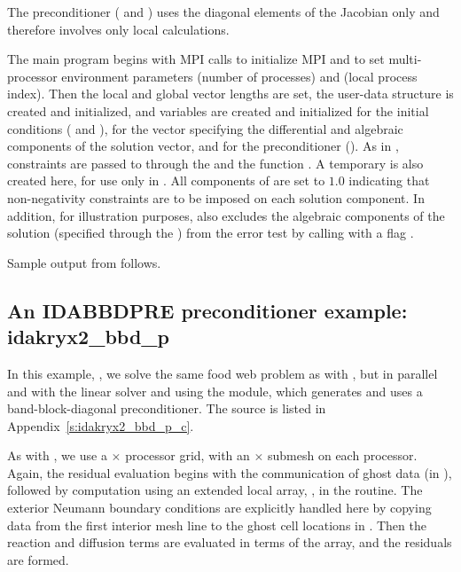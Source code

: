 The preconditioner ( and ) uses the diagonal 
elements of the Jacobian only and therefore involves only local calculations.

The  main program begins with MPI calls to initialize MPI and to
set multi-processor environment parameters  (number of processes) and
 (local process index).  Then the local and global vector lengths
are set, the user-data structure  is created and initialized, and
 variables are created and initialized for the initial conditions
( and ), for the vector  specifying the differential 
and algebraic components of the solution vector, and for the preconditioner
().  As in , constraints are passed to {\ida} through the
  and the function .  
A temporary   is also created here, for use only in
.
All components of  are set to $1.0$ indicating that
non-negativity constraints are to be imposed on each solution component.  
In addition, for illustration purposes,  also excludes the
algebraic components of the solution (specified through the 
) from the error test by calling  with a
flag .

Sample output from  follows.


\subsection{An IDABBDPRE preconditioner example: idakryx2\_bbd\_p}\label{ss:idakryx2_bbd_p}

In this example, , we solve the same food web problem as with
, but in parallel and with the {\idaspgmr} linear solver and
using the {\idabbdpre} module, which generates and uses a band-block-diagonal 
preconditioner.  The source is listed in Appendix~\ref{s:idakryx2_bbd_p_c}.

As with , we use a  $\times$  processor grid, with
an  $\times$  submesh on each processor.  Again, the residual
evaluation begins with the communication of ghost data (in ),
followed by computation using an extended local array, , in the
 routine.
The exterior Neumann boundary conditions are explicitly handled here
by copying data from the first interior mesh line to the ghost cell
locations in .  Then the reaction and diffusion terms are
evaluated in terms of the  array, and the residuals are formed.

